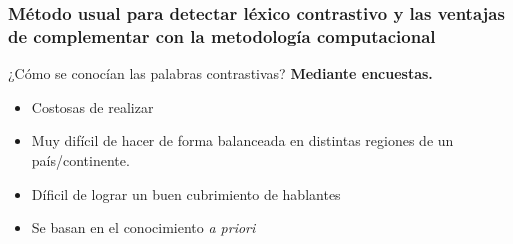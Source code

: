 \begin{frame}[c]\frametitle{Método usual para detectar léxico contrastivo y las ventajas de complementar con la metodología computacional}
    
    ¿Cómo se conocían las palabras contrastivas?
    \textbf{Mediante encuestas.}
    \begin{itemize}
        \item Costosas de realizar
        \item Muy difícil de hacer de forma balanceada en distintas regiones de un país/continente.
        \item Díficil de lograr un buen cubrimiento de hablantes
        \item \alert{Se basan en el conocimiento \textit{a priori}}
    \end{itemize}
\end{frame}




